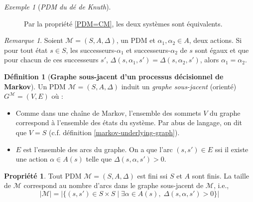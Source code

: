 \documentclass[12pt,a4paper]{report}
\theoremstyle{definition}%
\newtheorem{definition}{Définition}[chapter]
\newtheorem{propriete}{Propriété}[chapter]
\theoremstyle{remark}
\newtheorem{example}{Exemple}[chapter]
\newtheorem{remark}{Remarque}[chapter]
\newcommand{\ssi}{ssi }
\newcommand{\cf}{c.f. }
\let\labelitemi\labelitemii
\begin{document}
\begin{example}[\textit{PDM du dé de Knuth}]
\begin{figure}[H]
\begin{minipage}{0.45\textwidth}
		\end{minipage}
		\caption{Par la propriété \ref{PDM=CM}, les deux systèmes sont équivalents.}
		\label{PDM=CM-example}
	\end{figure}
\end{example}

\begin{remark}
	Soient $\mathcal{M} = (S, A, \Delta)$, un PDM et $\alpha_1, \alpha_2 \in A$,
	deux actions. Si pour tout état $s \in S$, les successeurs-$\alpha_1$ et
	successeurs-$\alpha_2$ de $s$ sont égaux et que pour chacun de ces successeurs
	$s'$, $\Delta(s, \alpha_1, s') = \Delta(s, \alpha_2, s')$, alors $\alpha_1 =
	\alpha_2$.
\end{remark}


\begin{definition}[\textbf{Graphe sous-jacent d'un processus décisionnel de Markov}]
	Un PDM $\mathcal{M} = (S, A, \Delta)$ induit un \textit{graphe sous-jacent} (orienté) $G^\mathcal{M} = (V, E)$ où :
	\begin{itemize}
		\renewcommand{\labelitemi}{\tiny $\bullet$}
		\item Comme dans une chaîne de Markov, l'ensemble des sommets $V$ du graphe correspond à l'ensemble des états du système. Par abus de langage, on dit que $V = S$ (\cf définition \ref{markov-underlying-graph}).
		\item $E$ est l'ensemble des arcs du graphe. On a que l'arc $(s, s') \in E$ \ssi il existe une action $\alpha \in A(s)$ telle que $\Delta(s, \alpha, s') > 0$.
	\end{itemize}
\end{definition}

\begin{propriete}
Tout PDM $\mathcal{M} = (S, A, \Delta)$ est fini ssi $S$ et $A$ sont finis. La taille de $\mathcal{M}$
correspond au nombre d'arcs dans le graphe sous-jacent de $\mathcal{M}$, i.e.,
\[ |\mathcal{M}| = |\{ (s, s') \in S \times S\; | \; \exists \alpha \in A(s), \; \Delta(s, \alpha, s') > 0 \}| \]
\end{propriete}
\end{document}
